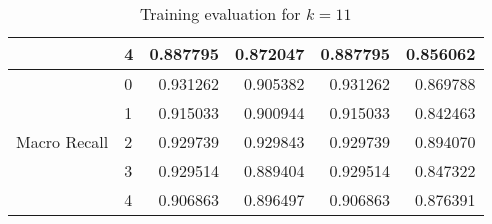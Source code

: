 \documentclass[twocolumn, a4paper, 8pt]{article}
\begin{document}
\begin{table}[h]
\begin{minipage}{0.45\textwidth}
{\begin{tabular}{llrrrr}
					& 4 & 0.887795 & 0.872047 & 0.887795 & 0.856062 \\
					\cline{1-6}
					\toprule
					\multirow[t]{5}{*}{Macro Recall} & 0 & 0.931262 & 0.905382 & 0.931262 & 0.869788 \\
					& 1 & 0.915033 & 0.900944 & 0.915033 & 0.842463 \\
					& 2 & 0.929739 & 0.929843 & 0.929739 & 0.894070 \\
					& 3 & 0.929514 & 0.889404 & 0.929514 & 0.847322 \\
					& 4 & 0.906863 & 0.896497 & 0.906863 & 0.876391 \\
					\bottomrule
				\end{tabular}
			}
			\caption{Training evaluation for $k = 11$}
			\label{tab:k11table}
		\end{minipage}
	\end{table}
	\label{sec:appendix}
\end{document}
